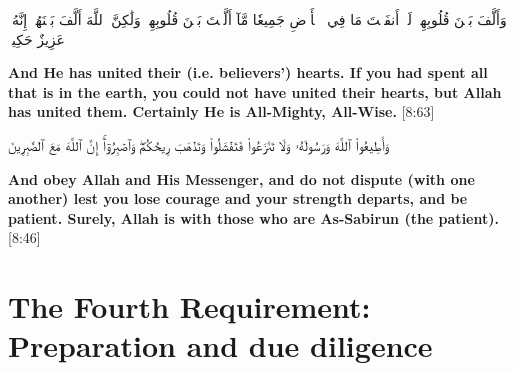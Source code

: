 \begin{center}
    \begin{RLtext}
        وَأَلَّفَ بَيۡنَ قُلُوبِهِمۡۚ لَوۡ أَنفَقۡتَ مَا فِي ٱلۡأَرۡضِ جَمِيعٗا مَّآ أَلَّفۡتَ بَيۡنَ قُلُوبِهِمۡ وَلَٰكِنَّ ٱللَّهَ أَلَّفَ بَيۡنَهُمۡۚ إِنَّهُۥ عَزِيزٌ حَكِيمٞ

    \end{RLtext}
\end{center}
\textbf{And He has united their (i.e. believers’) hearts. If you had spent all that is in the earth, you could not have united their hearts, but Allah has united them. Certainly He is All-Mighty, All-Wise.} [8:63]

\begin{center}
    \begin{RLtext}
        وَأَطِيعُواْ ٱللَّهَ وَرَسُولَهُۥ وَلَا تَنَٰزَعُواْ فَتَفۡشَلُواْ وَتَذۡهَبَ رِيحُكُمۡۖ وَٱصۡبِرُوٓاْۚ إِنَّ ٱللَّهَ مَعَ ٱلصَّٰبِرِينَ
    \end{RLtext}
\end{center}
\textbf{And obey Allah and His Messenger, and do not dispute (with one another) lest you lose courage and your strength departs, and be patient. Surely, Allah is with those who are As-Sabirun (the patient).} [8:46]


\section*{The Fourth Requirement: Preparation and due diligence}
